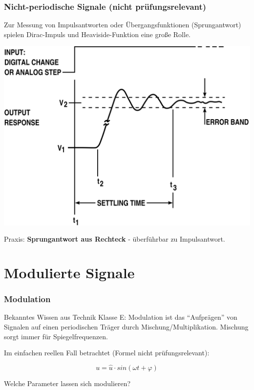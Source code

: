\begin{frame}
    \frametitle{Nicht-periodische Signale (nicht prüfungsrelevant)}

    Zur Messung von Impulsantworten oder Übergangsfunktionen (Sprungantwort)
    spielen Dirac-Impuls und Heaviside-Funktion eine große Rolle. \\[2em]

    \begin{center}
        \includegraphics[width=\textwidth,height=0.5\textheight,keepaspectratio]{a11/High_accuracy_settling_time_measurements_figure_1.png}
        \tiny \hyperlink{refs}{\cite{wc}}
    \end{center}

    Praxis: \textbf{Sprungantwort aus Rechteck} - überführbar zu Impulsantwort.

\end{frame}

\section{Modulierte Signale}

\begin{frame}
    \frametitle{Modulation}
  
    \begin{block}{Bekanntes Wissen aus Technik Klasse E:} %
        Modulation ist das "`Aufprägen"' von Signalen auf einen periodischen Träger
        durch Mischung/Multiplikation. Mischung sorgt immer für Spiegelfrequenzen.
    \end{block}

    \bigskip Im einfachen reellen Fall betrachtet (Formel nicht prüfungsrelevant):

    \begin{equation*}
        u = \hat{u} \cdot sin(\omega t + \varphi)
    \end{equation*}

    \vspace{2em}
    Welche Parameter lassen sich modulieren?

\end{frame}

